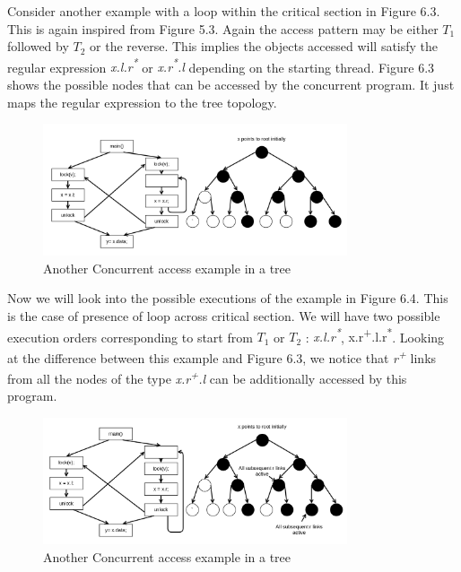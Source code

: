 Consider another example with a loop within the critical section in Figure 6.3. This is again inspired from Figure 5.3. Again the access pattern may be either $T_1$ followed by $T_2$ or the reverse. This implies the objects accessed will satisfy the regular expression \emph{x.l.r\textsuperscript{*}} or \emph{x.r\textsuperscript{*}.l} depending on the  starting thread. Figure 6.3 shows the possible nodes that can be accessed by the concurrent program. It just maps the regular expression to the tree topology. \\

\begin{figure}
	\centering
	\includegraphics[width=0.8\textwidth]{Figures/tree2.png}
	\caption{Another Concurrent access example in a tree}
	\label{fig:ch5example}
\end{figure}

Now we will look into the possible executions of the example in Figure 6.4. This is the case of presence of loop across critical section. We will have two possible execution orders corresponding to start from $T_1$ or $T_2$ : \emph{x.l.r\textsuperscript{*}}, {x.r\textsuperscript{+}.l.r\textsuperscript{*}}. Looking at the difference between this example and Figure 6.3, we notice that \emph{r\textsuperscript{+}} links from all the nodes of the type \emph{x.r\textsuperscript{+}.l} can be additionally accessed by this program. \\ 

\begin{figure}
	\centering
	\includegraphics[width=0.8\textwidth]{Figures/tree3.png}
	\caption{Another Concurrent access example in a tree}
	\label{fig:ch5example}
\end{figure}

